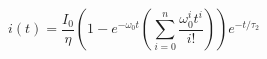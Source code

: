 \begin{equation}
    i(t) = \frac{I_0}{\eta} \left ( 1 - e^{-\omega_0 t} \left ( \sum\limits_{i=0}^n \frac{\omega_0^i t^i}{i!} \right ) \right ) e^{-t/\tau_2}
    \label{eqn:approx}
\end{equation}
